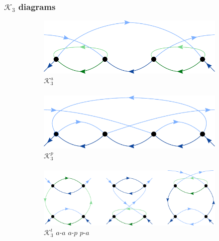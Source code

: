 \documentclass[10pt]{scrartcl}
\newcommand{\K}[2]{\mathcal{K}_#1^#2}
\begin{document}
\newpage

\subsubsection*{$\mathcal{K}_3$ diagrams}

\begin{figure}[h!]
\begin{subfigure}[c]{0.4\textwidth}
\phantom{.}\hspace{0.45cm}
\includegraphics[scale=0.3]{diagrams/PT4_K3a}
\\
\phantom{.}\hspace{1.8cm} $\K3a$
\\ \\
\phantom{.}\hspace{0.45cm}
\includegraphics[scale=0.3]{diagrams/PT4_K3p}
\\
\phantom{.}\hspace{1.8cm} $\K3p$
\\ \\
\phantom{.}\hspace{0.45cm}
\includegraphics[scale=0.3]{diagrams/PT4_K3t}
\\
$\K3t$ \hspace{0.5cm} $a$-$a$ \hspace{1.05cm} $a$-$p$ \hspace{1.05cm} $p$-$a$

\end{subfigure}
\end{figure}
\end{document}
